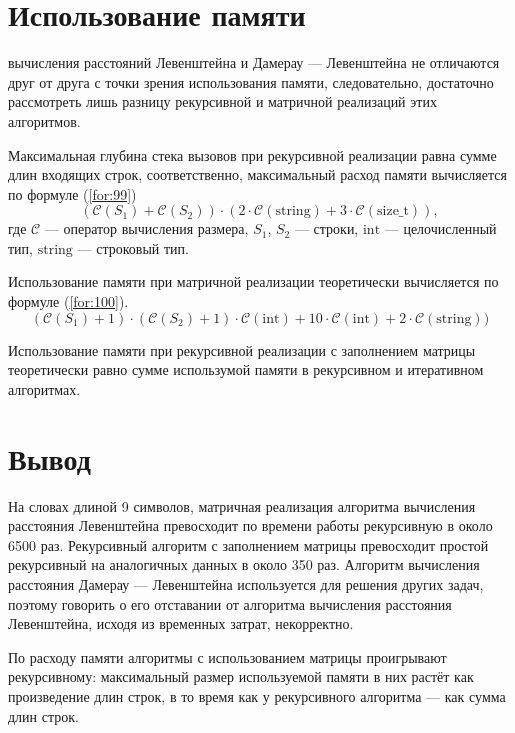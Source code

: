\section{Использование памяти}

 вычисления расстояний Левенштейна и Дамерау — Левенштейна не отличаются друг от друга с точки зрения использования памяти, следовательно, достаточно рассмотреть лишь разницу рекурсивной и матричной реализаций этих алгоритмов.

Максимальная глубина стека вызовов при рекурсивной реализации равна сумме длин входящих строк, соответственно, максимальный расход памяти вычисляется по формуле (\ref{for:99})
\begin{equation}
(\mathcal{C}(S_1) + \mathcal{C}(S_2)) \cdot (2 \cdot \mathcal{C}\mathrm{(string)} + 3 \cdot \mathcal{C}\mathrm{(size\_t)}),
\label{for:99}
\end{equation}
где $\mathcal{C}$ — оператор вычисления размера, $S_1$, $S_2$ — строки, $\mathrm{int}$ — целочисленный тип, $\mathrm{string}$ — строковый тип.

Использование памяти при матричной реализации теоретически вычисляется по формуле (\ref{for:100}).
\begin{equation}
(\mathcal{C}(S_1) + 1) \cdot (\mathcal{C}(S_2) + 1) \cdot \mathcal{C}\mathrm{(int)} + 10\cdot \mathcal{C}\mathrm{(int)} + 2 \cdot \mathcal{C}\mathrm{(string)})
\label{for:100}
\end{equation}

Использование памяти при рекурсивной реализации с заполнением матрицы теоретически равно сумме использумой памяти в рекурсивном и итеративном алгоритмах.



\section*{Вывод}

На словах длиной 9 символов, матричная реализация алгоритма вычисления расстояния Левенштейна превосходит по времени работы рекурсивную в около 6500 раз. Рекурсивный алгоритм с заполнением матрицы превосходит простой рекурсивный на аналогичных данных в около 350 раз. Алгоритм вычисления расстояния Дамерау — Левенштейна используется для решения других задач, поэтому говорить о его отставании от алгоритма вычисления расстояния Левенштейна, исходя из временных затрат, некорректно.

По расходу памяти алгоритмы с использованием матрицы проигрывают рекурсивному: максимальный размер используемой памяти в них растёт как произведение длин строк, в то время как у рекурсивного алгоритма — как сумма длин строк.
